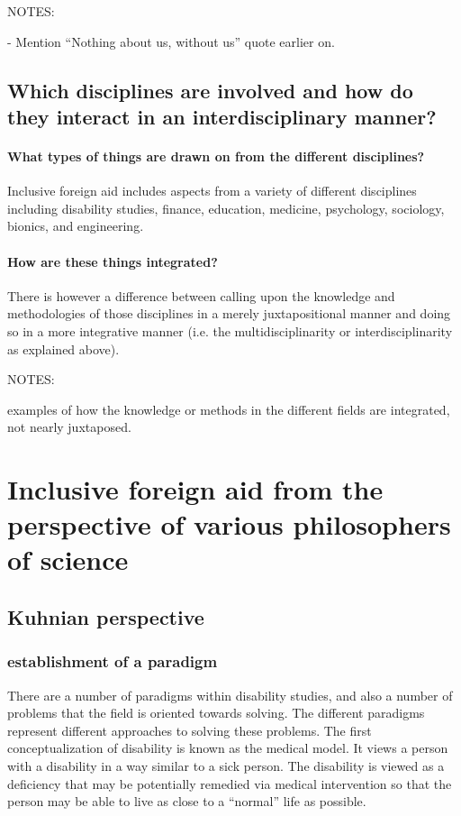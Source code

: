 \documentclass{lps}
\begin{document}
NOTES:

- Mention ``Nothing about us, without us'' quote earlier on.

\subsection{Which disciplines are involved and how do they interact in an
interdisciplinary manner?}

\paragraph{What types of things are drawn on from the different disciplines?}

Inclusive foreign aid includes aspects from a variety of different disciplines
including disability studies, finance, education, medicine, psychology,
sociology, bionics, and engineering. 

\paragraph{How are these things integrated?}

There is however a difference between calling upon the knowledge and
methodologies of those disciplines in a merely juxtapositional manner and
doing so in a more integrative manner (i.e. the multidisciplinarity or
interdisciplinarity as explained above).


NOTES:

examples of how the knowledge or methods in the different fields are
integrated, not nearly juxtaposed.

\section{Inclusive foreign aid from the perspective of various philosophers of
science}

\subsection{Kuhnian perspective}

\subsubsection{establishment of a paradigm}

There are a number of paradigms within disability studies, and also a number
of problems that the field is oriented towards solving. The different
paradigms represent different approaches to solving these problems. The first
conceptualization of disability is known as the medical model. It views a
person with a disability in a way similar to a sick person. The disability is
viewed as a deficiency that may be potentially remedied via medical
intervention so that the person may be able to live as close to a ``normal''
life as possible. 
\end{document}
